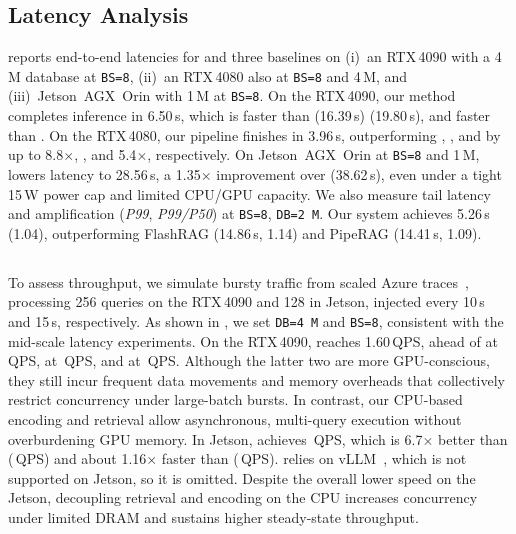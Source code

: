 \subsection{Latency Analysis}
\label{sec:main-latency-results}
 reports end-to-end latencies for \design{} and three baselines on 
(i)~an RTX\,4090 with a 4\,M database at \texttt{BS=8}, 
(ii)~an RTX\,4080 also at \texttt{BS=8} and 4\,M, and 
(iii)~Jetson~AGX~Orin with 1\,M at \texttt{BS=8}.
On the RTX\,4090, our method completes inference in 6.50\,s, which is  faster than \flashRAG{} (16.39\,s)  \pipeRAG{} (19.80\,s), and \new{$4.4\times$} faster than \edgeRAG{}.
On the RTX\,4080, our pipeline finishes in 3.96\,s, outperforming \edgeRAG{}, \flashRAG{}, and \pipeRAG{} by up to 8.8$\times$, \new{$2.0\times$}, and 5.4$\times$, respectively. 
On Jetson~AGX~Orin at \texttt{BS=8} and 1\,M, \design{} lowers latency to 28.56\,s, a 1.35$\times$ improvement over \edgeRAG{} (38.62\,s), even under a tight 15\,W power cap and limited CPU/GPU capacity. 
We also measure tail latency and amplification (\textit{P99}, \textit{P99/P50}) at \texttt{BS=8}, \texttt{DB=2\,M}. Our system achieves 5.26\,s (1.04), outperforming FlashRAG (14.86\,s, 1.14) and PipeRAG (14.41\,s, 1.09).


\subsection{}
\label{sec:throughput}
To assess throughput, we simulate bursty traffic from scaled Azure traces~\cite{azureTrace}, processing 256 queries on the RTX\,4090 and 128 in Jetson, injected every 10\,s and 15\,s, respectively. As shown in , we set \texttt{DB=4\,M} and \texttt{BS=8}, consistent with the mid-scale latency experiments. On the RTX\,4090, \design{} reaches 1.60\,QPS, ahead of \edgeRAG{} at \,QPS, \flashRAG{} at \,QPS, and \pipeRAG{} at \,QPS. Although the latter two are more GPU-conscious, they still incur frequent data movements and memory overheads that collectively restrict concurrency under large-batch bursts. In contrast, our CPU-based encoding and retrieval allow asynchronous, multi-query execution without overburdening GPU memory. In Jetson, \design{} achieves \,QPS, which is 6.7$\times$ better than \edgeRAG{} (\,QPS) and about 1.16$\times$ faster than \pipeRAG{} (\,QPS). \flashRAG{} relies on vLLM~\cite{vllm}, which is not supported on Jetson, so it is omitted. Despite the overall lower speed on the Jetson, decoupling retrieval and encoding on the CPU increases concurrency under limited DRAM and sustains higher steady-state throughput.

